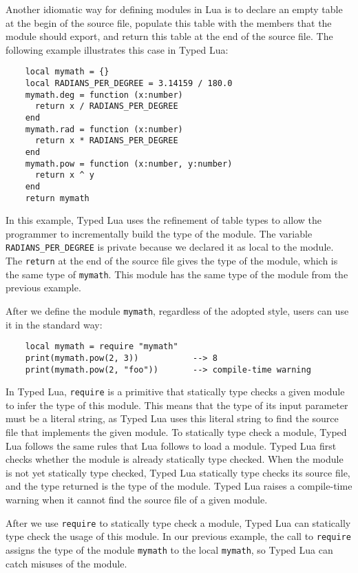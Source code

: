 Another idiomatic way for defining modules in Lua is to declare an
empty table at the begin of the source file,
populate this table with the members that the module should export,
and return this table at the end of the source file. 
The following example illustrates this case in Typed Lua:
\begin{verbatim}
    local mymath = {}
    local RADIANS_PER_DEGREE = 3.14159 / 180.0
    mymath.deg = function (x:number)
      return x / RADIANS_PER_DEGREE
    end
    mymath.rad = function (x:number)
      return x * RADIANS_PER_DEGREE
    end
    mymath.pow = function (x:number, y:number)
      return x ^ y
    end
    return mymath
\end{verbatim}

In this example, Typed Lua uses the refinement of table types to
allow the programmer to incrementally build the type of the module.
The variable \texttt{RADIANS\string_PER\string_DEGREE}
is private because we declared it as local to the module. 
The \texttt{return} at the end of the source file gives the
type of the module, which is the same type of \texttt{mymath}.
This module has the same type of the module from the previous example.

After we define the module \texttt{mymath}, regardless of the adopted style,
users can use it in the standard way:
\begin{verbatim}
    local mymath = require "mymath"
    print(mymath.pow(2, 3))           --> 8
    print(mymath.pow(2, "foo"))       --> compile-time warning
\end{verbatim}

In Typed Lua, \texttt{require} is a primitive that statically type checks
a given module to infer the type of this module.
This means that the type of its input parameter must be a literal string,
as Typed Lua uses this literal string to find the source file that
implements the given module.
To statically type check a module, Typed Lua follows the same rules
that Lua follows to load a module.
Typed Lua first checks whether the module is already statically type checked.
When the module is not yet statically type checked, Typed Lua
statically type checks its source file, and the type returned is the
type of the module.
Typed Lua raises a compile-time warning when it cannot find the source
file of a given module.

After we use \texttt{require} to statically type check a module,
Typed Lua can statically type check the usage of this module.
In our previous example, the call to \texttt{require} assigns the type
of the module \texttt{mymath} to the local \texttt{mymath},
so Typed Lua can catch misuses of the module.

